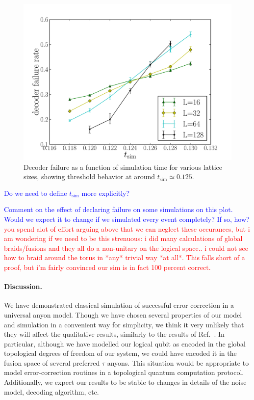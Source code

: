 \documentclass[aps, prl, letterpaper, twocolumn, superscriptaddress, notitlepage, 10pt]{revtex4-1}
\newcommand{\cggb}[1]{\textcolor{blue}{#1}}
\newcommand{\dude}[1]{\textcolor{red}{#1}}
\begin{document}
\begin{figure}[th!]
\begin{center}
	\includegraphics[width=\columnwidth]{anyons-kyle.pdf}
\caption{Decoder failure as a function of simulation time for various lattice sizes, showing 
threshold behavior at around $t_{\mathrm{sim}}\simeq 0.125$.}
\label{f:threshold}
\end{center}
\end{figure}

\cggb{Do we need to define $t_{\mathrm{sim}}$ more explicitly?}

\cggb{Comment on the effect of declaring failure on some simulations on this plot. Would 
we expect it to change if we simulated every event completely? If so, how?}
\dude{you spend alot of effort arguing above that we can
neglect these occurances, but i am wondering if we need to be
this strenuous: i did many calculations of global braids/fusions
and they all do a non-unitary on the logical space.. i could not
see how to braid around the torus in *any* trivial way *at all*.
This falls short of a proof, but i'm fairly convinced our sim is
in fact 100 percent correct.}

\paragraph{Discussion.}

We have demonstrated classical simulation of successful error correction in a universal anyon 
model. Though we have chosen several properties of our model and simulation in a 
convenient way for simplicity, we think it very unlikely that they will affect the qualitative 
results, similarly to the results of Ref.~\cite{Brell2013}. In particular, although we have 
modelled our logical qubit as encoded in the global topological degrees of freedom of our 
system, we could have encoded it in the fusion space of several preferred $\tau$ anyons. 
This situation would be appropriate to model error-correction routines in a topological 
quantum computation protocol. Additionally, we expect our results to be stable to changes 
in details of the noise model, decoding algorithm, etc.
\end{document}
